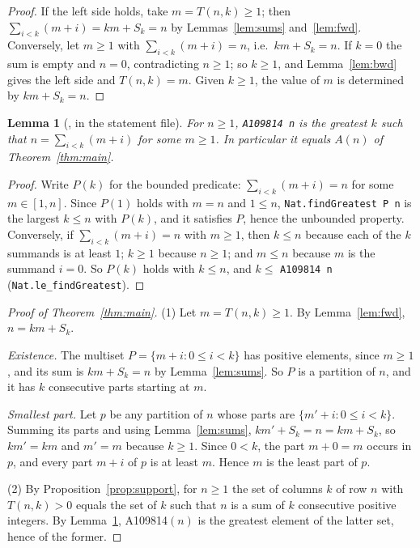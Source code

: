 \documentclass[11pt]{amsart}
\theoremstyle{plain}
\newtheorem{lemma}[theorem]{Lemma}
\theoremstyle{definition}
\begin{document}
\begin{proof}
If the left side holds, take $m=T(n,k)\ge1$; then $\sum_{i<k}(m+i)=km+S_k=n$ by Lemmas~\ref{lem:sums} and~\ref{lem:fwd}. Conversely, let $m\ge1$ with $\sum_{i<k}(m+i)=n$, i.e.\ $km+S_k=n$. If $k=0$ the sum is empty and $n=0$, contradicting $n\ge1$; so $k\ge1$, and Lemma~\ref{lem:bwd} gives the left side and $T(n,k)=m$. Given $k\ge1$, the value of $m$ is determined by $km+S_k=n$.
\end{proof}

\begin{lemma}[, in the statement file]\label{lem:a109814}
For $n\ge1$, \texttt{A109814 n} is the greatest $k$ such that $n=\sum_{i<k}(m+i)$ for some $m\ge1$. In particular it equals $A(n)$ of Theorem~\ref{thm:main}.
\end{lemma}

\begin{proof}
Write $P(k)$ for the bounded predicate: $\sum_{i<k}(m+i)=n$ for some $m\in[1,n]$. Since $P(1)$ holds with $m=n$ and $1\le n$, \texttt{Nat.findGreatest P n} is the largest $k\le n$ with $P(k)$, and it satisfies $P$, hence the unbounded property. Conversely, if $\sum_{i<k}(m+i)=n$ with $m\ge1$, then $k\le n$ because each of the $k$ summands is at least $1$; $k\ge1$ because $n\ge1$; and $m\le n$ because $m$ is the summand $i=0$. So $P(k)$ holds with $k\le n$, and $k\le$ \texttt{A109814 n} (\texttt{Nat.le\_findGreatest}).
\end{proof}

\begin{proof}[Proof of Theorem~\ref{thm:main}]
(1) Let $m=T(n,k)\ge1$. By Lemma~\ref{lem:fwd}, $n=km+S_k$.

\emph{Existence.} The multiset $P=\{m+i:0\le i<k\}$ has positive elements, since $m\ge1$, and its sum is $km+S_k=n$ by Lemma~\ref{lem:sums}. So $P$ is a partition of $n$, and it has $k$ consecutive parts starting at $m$.

\emph{Smallest part.} Let $p$ be any partition of $n$ whose parts are $\{m'+i:0\le i<k\}$. Summing its parts and using Lemma~\ref{lem:sums}, $km'+S_k=n=km+S_k$, so $km'=km$ and $m'=m$ because $k\ge1$. Since $0<k$, the part $m+0=m$ occurs in $p$, and every part $m+i$ of $p$ is at least $m$. Hence $m$ is the least part of $p$.

(2) By Proposition~\ref{prop:support}, for $n\ge1$ the set of columns $k$ of row $n$ with $T(n,k)>0$ equals the set of $k$ such that $n$ is a sum of $k$ consecutive positive integers. By Lemma~\ref{lem:a109814}, A109814$(n)$ is the greatest element of the latter set, hence of the former.
\end{proof}
\end{document}
